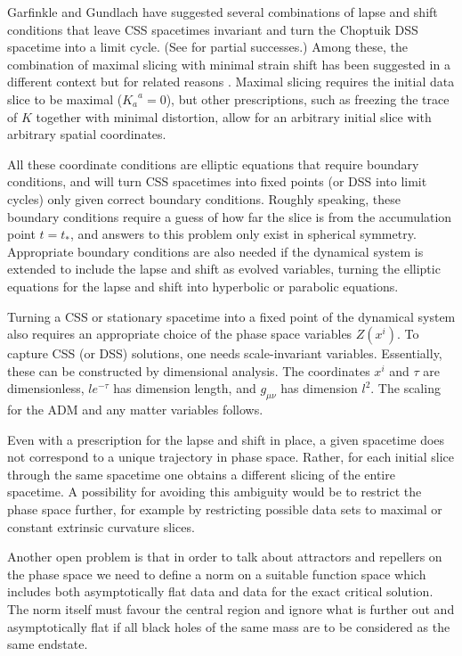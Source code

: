 \documentclass{article}
\begin{document}
Garfinkle and Gundlach \cite{GarfinkleGundlach} have suggested several
combinations of lapse and shift conditions that leave CSS spacetimes
invariant and turn the Choptuik DSS spacetime into a limit cycle.
(See \cite{GarfinkleMeyer,Garfinkle2} for
partial successes.) Among these, the combination of maximal slicing
with minimal strain shift has been suggested in a different context
but for related reasons \cite{SmarrYork}. Maximal slicing requires the
initial data slice to be maximal (${K_a}^a=0$), but other
prescriptions, such as freezing the trace of $K$ together with minimal
distortion, allow for an arbitrary initial slice with arbitrary
spatial coordinates.

All these coordinate conditions are elliptic equations that require
boundary conditions, and will turn CSS spacetimes into fixed points
(or DSS into limit cycles) only given correct boundary
conditions. Roughly speaking, these boundary conditions require a
guess of how far the slice is from the accumulation point $t=t_*$, and
answers to this problem only exist in spherical symmetry. Appropriate
boundary conditions are also needed if the dynamical system is
extended to include the lapse and shift as evolved variables, turning
the elliptic equations for the lapse and shift into hyperbolic or
parabolic equations.

Turning a CSS or stationary spacetime into a fixed point of the
dynamical system also requires an appropriate choice of the phase
space variables $Z(x^i)$. To capture CSS (or DSS)
solutions, one needs scale-invariant variables. Essentially, these can
be constructed by dimensional analysis. The coordinates $x^i$ and
$\tau$ are dimensionless, $le^{-\tau}$ has dimension length, and
$g_{\mu\nu}$ has dimension $l^2$. The scaling for the ADM and any
matter variables follows.

Even with a prescription for the lapse and shift in place, a given
spacetime does not correspond to a unique trajectory in phase
space. Rather, for each initial slice through the same spacetime one
obtains a different slicing of the entire spacetime. A possibility for
avoiding this ambiguity would be to restrict the phase space further,
for example by restricting possible data sets to maximal or constant
extrinsic curvature slices.

Another open problem is that in order to talk about attractors and
repellers on the phase space we need to define a norm on a suitable
function space which includes both asymptotically flat data and data for
the exact critical solution. The norm itself must favour the central region
and ignore what is further out and asymptotically flat if all black
holes of the same mass are to be considered as the same
endstate. 
\end{document}
